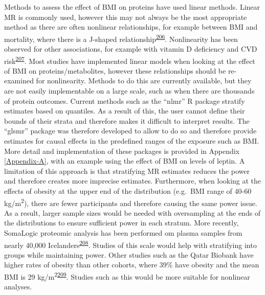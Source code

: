 \documentclass[11pt,twoside]{bristolthesis}
\begin{document}
Methods to assess the effect of BMI on proteins have used linear methods. Linear MR is commonly used, however this may not always be the most appropriate method as there are often nonlinear relationships, for example between BMI and mortality, where there is a J-shaped relationship\textsuperscript{\protect\hyperlink{ref-Sun2019}{206}}. Nonlinearity has been observed for other associations, for example with vitamin D deficiency and CVD risk\textsuperscript{\protect\hyperlink{ref-Zhou2021}{207}}. Most studies have implemented linear models when looking at the effect of BMI on proteins/metabolites, however these relationships should be re-examined for nonlinearity. Methods to do this are currently available, but they are not easily implementable on a large scale, such as when there are thousands of protein outcomes. Current methods such as the ``nlmr'' R package stratify estimates based on quantiles. As a result of this, the user cannot define their bounds of their strata and therefore makes it difficult to interpret results. The ``glsmr'' package was therefore developed to allow to do so and therefore provide estimates for causal effects in the predefined ranges of the exposure such as BMI. More detail and implementation of these packages is provided in Appendix \ref{Appendix-A}, with an example using the effect of BMI on levels of leptin. A limitation of this approach is that stratifying MR estimates reduces the power and therefore creates more imprecise estimates. Furthermore, when looking at the effects of obesity at the upper end of the distribution (e.g.~BMI range of 40-60 kg/m\textsuperscript{2}), there are fewer participants and therefore causing the same power issue. As a result, larger sample sizes would be needed with oversampling at the ends of the distributions to ensure sufficient power in each stratum. More recently, SomaLogic proteomic analysis has been performed om plasma samples from nearly 40,000 Icelanders\textsuperscript{\protect\hyperlink{ref-Ferkingstad2021}{208}}. Studies of this scale would help with stratifying into groups while maintaining power. Other studies such as the Qatar Biobank have higher rates of obesity than other cohorts, where 39\% have obesity and the mean BMI is 29 kg/m\textsuperscript{2}\textsuperscript{\protect\hyperlink{ref-AlKuwari2015}{209}}. Studies such as this would be more suitable for nonlinear analyses.
\end{document}
